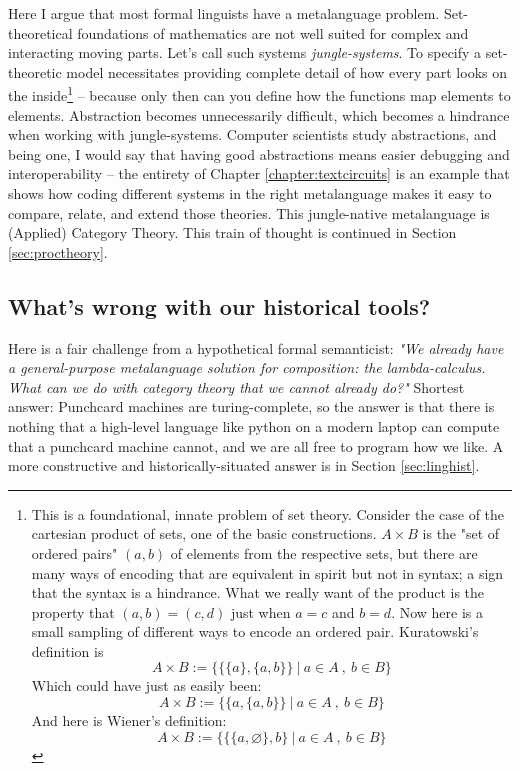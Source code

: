 Here I argue that most formal linguists have a metalanguage problem. Set-theoretical foundations of mathematics are not well suited for complex and interacting moving parts. Let's call such systems \emph{jungle-systems}. To specify a set-theoretic model necessitates providing complete detail of how every part looks on the inside\footnote{This is a foundational, innate problem of set theory. Consider the case of the cartesian product of sets, one of the basic constructions. $A \times B$ is the "set of ordered pairs" $(a,b)$ of elements from the respective sets, but there are many ways of encoding that are equivalent in spirit but not in syntax; a sign that the syntax is a hindrance. What we really want of the product is the property that $(a,b) = (c,d)$ just when $a = c$ and $b = d$. Now here is a small sampling of different ways to encode an ordered pair. Kuratowski's definition is
\[A \times B := \bigg\{ \{\{a\},\{a,b\}\} \ | \ a \in A \ , \ b \in B \bigg\}\]
Which could have just as easily been:
\[A \times B := \bigg\{ \{a,\{a,b\}\} \ | \ a \in A \ , \ b \in B \bigg\}\]
And here is Wiener's definition:
\[A \times B := \bigg\{ \{\{a,\varnothing\},b\} \ | \ a \in A \ , \ b \in B \bigg\}\]} -- because only then can you define how the functions map elements to elements. Abstraction becomes unnecessarily difficult, which becomes a hindrance when working with jungle-systems. Computer scientists study abstractions, and being one, I would say that having good abstractions means easier debugging and interoperability -- the entirety of Chapter \ref{chapter:textcircuits} is an example that shows how coding different systems in the right metalanguage makes it easy to compare, relate, and extend those theories. This jungle-native metalanguage is (Applied) Category Theory. This train of thought is continued in Section \ref{sec:proctheory}.

\subsection{What's wrong with our historical tools?}

Here is a fair challenge from a hypothetical formal semanticist: \emph{"We already have a general-purpose metalanguage solution for composition: the lambda-calculus. What can we do with category theory that we cannot already do?"} Shortest answer: Punchcard machines are turing-complete, so the answer is that there is nothing that a high-level language like python on a modern laptop can compute that a punchcard machine cannot, and we are all free to program how we like. A more constructive and historically-situated answer is in Section \ref{sec:linghist}.

